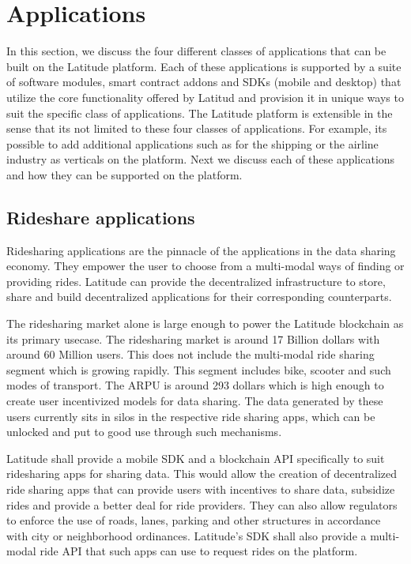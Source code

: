 \section{Applications}
\label{sec:apps}

In this section, we discuss the four different classes of applications that can be built on the Latitude platform. Each
of these applications is supported by a suite of software modules, smart contract addons and SDKs (mobile and desktop)
that utilize the core functionality offered by Latitud and provision it in unique ways to suit the specific class of
applications. The Latitude platform is extensible in the sense that its not limited to these four classes of
applications. For example, its possible to add additional applications such as for the shipping or the airline industry
as verticals on the platform. Next we discuss each of these applications and how they can be supported on the platform.

\subsection{Rideshare applications}

Ridesharing applications are the pinnacle of the applications in the data sharing economy. They empower the user to
choose from a multi-modal ways of finding or providing rides. Latitude can provide the decentralized infrastructure to
store, share and build decentralized applications for their corresponding counterparts.

The ridesharing market alone is large enough to power the Latitude blockchain as its primary usecase. The ridesharing
market is around 17 Billion dollars with around 60 Million users. This does not include the multi-modal ride sharing
segment which is growing rapidly. This segment includes bike, scooter and such modes of transport. The ARPU is around 
293 dollars which is high enough to create user incentivized models for data sharing. The data generated by these users
currently sits in silos in the respective ride sharing apps, which can be unlocked and put to good use through such
mechanisms. 

Latitude shall provide a mobile SDK and a blockchain API specifically to suit ridesharing apps for sharing data. This
would allow the creation of decentralized ride sharing apps that can provide users with incentives to share data,
subsidize rides and provide a better deal for ride providers. They can also allow regulators to enforce the use of
roads, lanes, parking and other structures in accordance with city or neighborhood ordinances. Latitude's SDK shall also
provide a multi-modal ride API that such apps can use to request rides on the platform.

